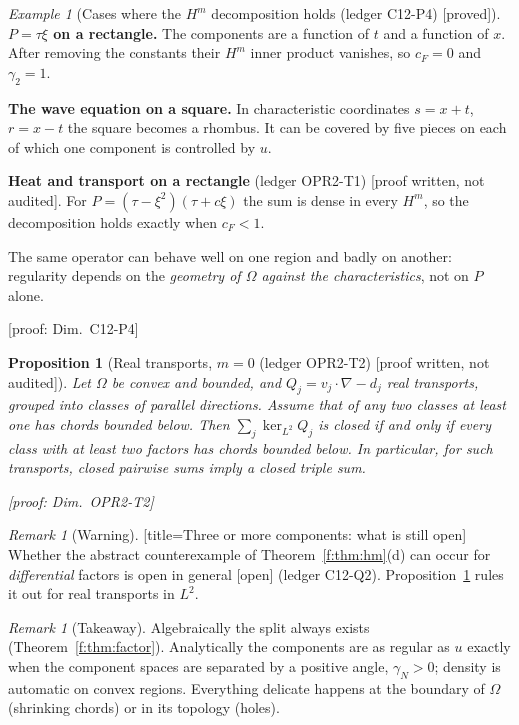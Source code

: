 \documentclass[11pt]{article}
\theoremstyle{plain}
\newtheorem{proposition}[theorem]{Proposition}
\theoremstyle{definition}
\theoremstyle{remark}
\newtheorem{remark}[theorem]{Remark}
\newtheorem{example}[theorem]{Example}
\newcommand{\badge}[2]{\textcolor{#1}{\textsf{\footnotesize[#2]}}}
\newcommand{\proved}[1][]{\badge{cC}{proved#1}}
\newcommand{\openq}{\badge{cB}{open}}
\newcommand{\led}[1]{\textcolor{cG}{\textsf{\footnotesize(ledger #1)}}}
\newenvironment{caution}{\begin{remark}[Warning]}{\end{remark}}
\newenvironment{keypoint}{\begin{remark}[Takeaway]}{\end{remark}}
\newcommand{\dimref}[1]{\textsf{\footnotesize[proof: Dim.~#1]}}
\newcommand{\pw}{\badge{cD}{proof written, not audited}}
\begin{document}
\begin{example}[{Cases where the $H^m$ decomposition holds \led{C12-P4} \proved}]
\textbf{$P=\tau\xi$ on a rectangle.} The components are a function of $t$ and a function of $x$. After removing the constants their $H^m$ inner product vanishes, so $c_F=0$ and $\gamma_2=1$.

\textbf{The wave equation on a square.} In characteristic coordinates $s=x+t$, $r=x-t$ the square becomes a rhombus. It can be covered by five pieces on each of which one component is controlled by $u$.

\textbf{Heat and transport on a rectangle} \led{OPR2-T1} \pw. For $P=(\tau-\xi^2)(\tau+c\xi)$ the sum is dense in every $H^m$, so the decomposition holds exactly when $c_F<1$.

The same operator can behave well on one region and badly on another: regularity depends on the \emph{geometry of $\Omega$ against the characteristics}, not on $P$ alone.

\dimref{C12-P4}
\end{example}

\begin{proposition}[{Real transports, $m=0$ \led{OPR2-T2} \pw}]\label{prop:transports}
Let $\Omega$ be convex and bounded, and $Q_j=v_j\cdot\nabla-d_j$ real transports, grouped into classes of parallel directions. Assume that of any two classes at least one has chords bounded below. Then $\sum_j\ker_{L^2}Q_j$ is closed if and only if every class with at least two factors has chords bounded below. In particular, for such transports, closed pairwise sums imply a closed triple sum.

\dimref{OPR2-T2}
\end{proposition}

\begin{caution}[title={Three or more components: what is still open}]
Whether the abstract counterexample of Theorem~\ref{f:thm:hm}(d) can occur for \emph{differential} factors is open in general \openq{} \led{C12-Q2}. Proposition~\ref{prop:transports} rules it out for real transports in $L^2$.
\end{caution}

\begin{keypoint}
Algebraically the split always exists (Theorem~\ref{f:thm:factor}). Analytically the components are as regular as $u$ exactly when the component spaces are separated by a positive angle, $\gamma_N>0$; density is automatic on convex regions. Everything delicate happens at the boundary of $\Omega$ (shrinking chords) or in its topology (holes).
\end{keypoint}
\end{document}
